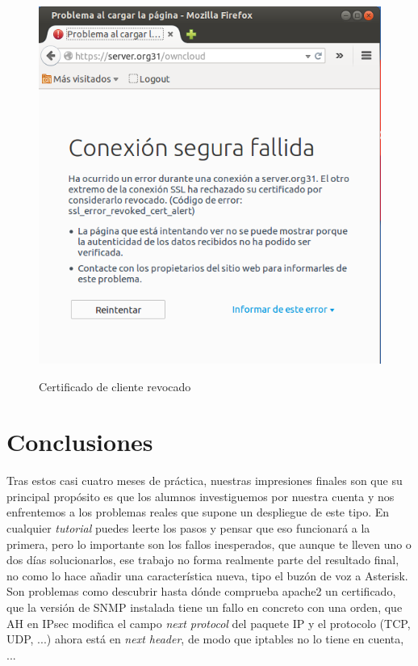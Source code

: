 \documentclass[]{article}
\begin{document}
\begin{figure}[h]
	\caption{Certificado de cliente revocado}
	\centering
	\includegraphics[scale=0.5]{images/certs/revoked.png}
	\label{fig:revoked}
\end{figure}



\section{Conclusiones}

Tras estos casi cuatro meses de práctica, nuestras impresiones finales son que su principal propósito es que los alumnos investiguemos por nuestra cuenta y nos enfrentemos a los problemas reales que supone un despliegue de este tipo. En cualquier \textit{tutorial} puedes leerte los pasos y pensar que eso funcionará a la primera, pero lo importante son los fallos inesperados, que aunque te lleven uno o dos días solucionarlos, ese trabajo no forma realmente parte del resultado final, no como lo hace añadir una característica nueva, tipo el buzón de voz a Asterisk. Son problemas como descubrir hasta dónde comprueba apache2 un certificado, que la versión de SNMP instalada tiene un fallo en concreto con una orden, que AH en IPsec modifica el campo \textit{next protocol} del paquete IP y el protocolo (TCP, UDP, ...) ahora está en \textit{next header}, de modo que iptables no lo tiene en cuenta, ...
               
\end{document}
